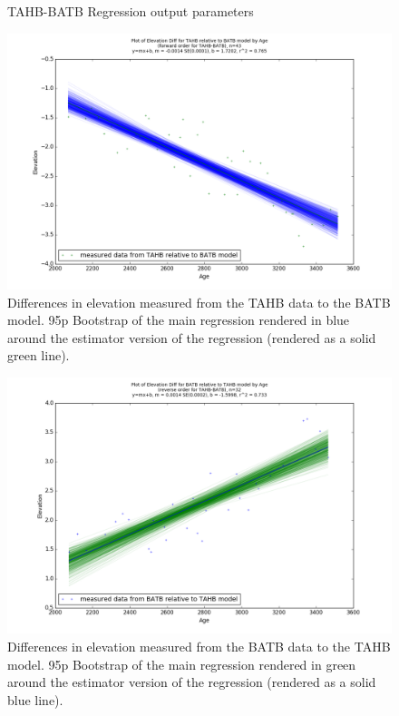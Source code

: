 \begin{figure}[H]
	\begin{flushleft}
	\end{flushleft}
	\caption{TAHB-BATB Regression output parameters}
	\label{fig:TAHBxBATB_regression}
\end{figure}


\newpage

\begin{figure}[H]
	\includegraphics[width=1.7\linewidth, angle=270 ]{data/bothNonZero/withinSeventyFivePercent/gias/theGIA_TAHB_relative_to_BATB.png}
	\caption{Differences in elevation measured from the TAHB data to the BATB model. 95p Bootstrap of the main regression rendered in blue around the estimator version of the regression (rendered as a solid green line).}
	\label{fig:gias_TAHBxBATB}
\end{figure}
\newpage


\begin{figure}[H]
	\includegraphics[width=1.7\linewidth, angle=270 ]{data/bothNonZero/withinSeventyFivePercent/gias/theGIA_BATB_relative_to_TAHB.png}
	\caption{Differences in elevation measured from the BATB data to the TAHB model. 95p Bootstrap of the main regression rendered in green around the estimator version of the regression (rendered as a solid blue line).}
	\label{fig:gias_BATBxTAHB}
\end{figure}
\newpage






